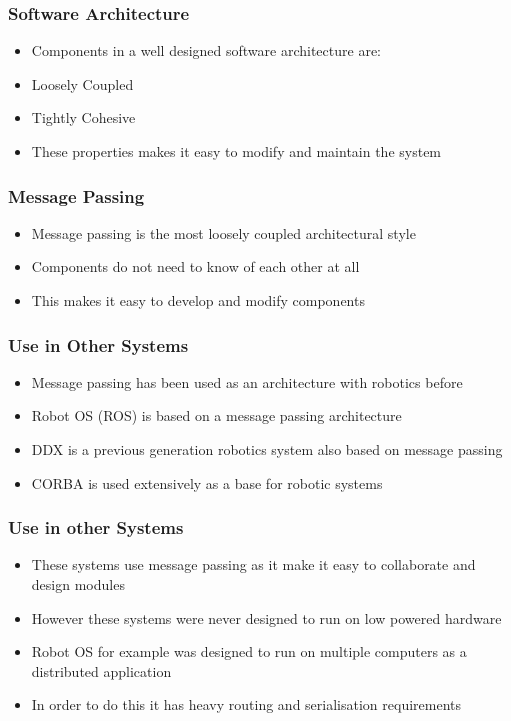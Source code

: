 \documentclass{beamer}
\begin{document}
	\begin{frame}
		\frametitle{Software Architecture}
		\begin{itemize}
			\item Components in a well designed software architecture are:
			\item Loosely Coupled
			\item Tightly Cohesive
			\item These properties makes it easy to modify and maintain the system
		\end{itemize}
	\end{frame}
	
	\begin{frame}
		\frametitle{Message Passing}
		\begin{itemize}
			\item Message passing is the most loosely coupled architectural style
			\item Components do not need to know of each other at all
			\item This makes it easy to develop and modify components
		\end{itemize}
	\end{frame}
	
	\begin{frame}
		\frametitle{Use in Other Systems}
		\begin{itemize}
		\item Message passing has been used as an architecture with robotics before
			\item Robot OS (ROS) is based on a message passing architecture
			\item DDX is a previous generation robotics system also based on message passing
			\item CORBA is used extensively as a base for robotic systems
		\end{itemize}
	\end{frame}
	
	\begin{frame}
		\frametitle{Use in other Systems}
		\begin{itemize}
			\item These systems use message passing as it make it easy to collaborate and design modules
			\item However these systems were never designed to run on low powered hardware
			\item Robot OS for example was designed to run on multiple computers as a distributed application
			\item In order to do this it has heavy routing and serialisation requirements
		\end{itemize}
	\end{frame}
	
\end{document}
